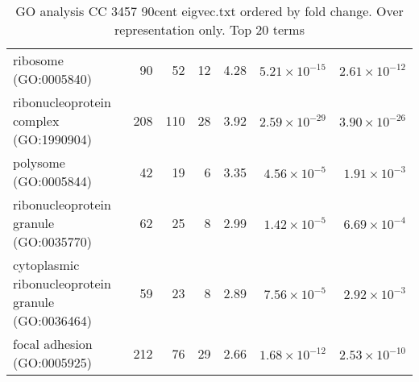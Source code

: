\begin{table}[ht]
\begin{adjustbox}{width=\textwidth}
\begin{tabular}{lrrrlrr}
  ribosome (GO:0005840) & 90 & 52 & 12 & 4.28 & $5.21 \times 10^{-15}$ & $2.61 \times 10^{-12}$ \\ 
  ribonucleoprotein complex (GO:1990904) & 208 & 110 & 28 & 3.92 & $2.59 \times 10^{-29}$ & $3.90 \times 10^{-26}$ \\ 
  polysome (GO:0005844) & 42 & 19 & 6 & 3.35 & $4.56 \times 10^{-5}$ & $1.91 \times 10^{-3}$ \\ 
  ribonucleoprotein granule (GO:0035770) & 62 & 25 & 8 & 2.99 & $1.42 \times 10^{-5}$ & $6.69 \times 10^{-4}$ \\ 
  cytoplasmic ribonucleoprotein granule (GO:0036464) & 59 & 23 & 8 & 2.89 & $7.56 \times 10^{-5}$ & $2.92 \times 10^{-3}$ \\ 
  focal adhesion (GO:0005925) & 212 & 76 & 29 & 2.66 & $1.68 \times 10^{-12}$ & $2.53 \times 10^{-10}$ \\ 
   \hline
\end{tabular}
\end{adjustbox}
\caption{GO analysis CC 3457 90cent eigvec.txt ordered by fold change. Over representation only. Top 20 terms} 
\label{tab:GO analysis CC 3457 90cent eigvec.txt ordered by fold change. Over representation only. Top 20 terms}
\end{table}




